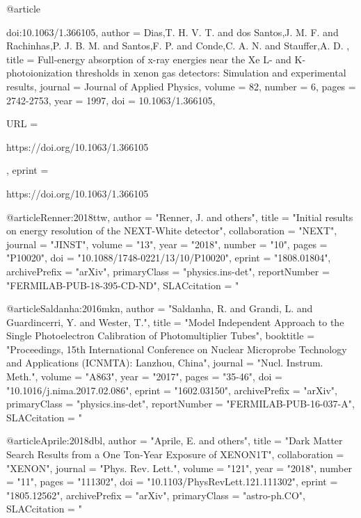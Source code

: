 {{{{{{{{{{{@article{doi:10.1063/1.366105,
author = {Dias,T. H. V. T.  and dos Santos,J. M. F.  and Rachinhas,P. J. B. M.  and Santos,F. P.  and Conde,C. A. N.  and Stauffer,A. D. },
title = {Full-energy absorption of x-ray energies near the Xe L- and K-photoionization thresholds in xenon gas detectors: Simulation and experimental results},
journal = {Journal of Applied Physics},
volume = {82},
number = {6},
pages = {2742-2753},
year = {1997},
doi = {10.1063/1.366105},

URL = { 
        https://doi.org/10.1063/1.366105
    
},
eprint = { 
        https://doi.org/10.1063/1.366105
    
}

}

@article{Renner:2018ttw,
      author         = "Renner, J. and others",
      title          = "{Initial results on energy resolution of the NEXT-White
                        detector}",
      collaboration  = "NEXT",
      journal        = "JINST",
      volume         = "13",
      year           = "2018",
      number         = "10",
      pages          = "P10020",
      doi            = "10.1088/1748-0221/13/10/P10020",
      eprint         = "1808.01804",
      archivePrefix  = "arXiv",
      primaryClass   = "physics.ins-det",
      reportNumber   = "FERMILAB-PUB-18-395-CD-ND",
      SLACcitation   = "%
}

@article{Saldanha:2016mkn,
      author         = "Saldanha, R. and Grandi, L. and Guardincerri, Y. and
                        Wester, T.",
      title          = "{Model Independent Approach to the Single Photoelectron
                        Calibration of Photomultiplier Tubes}",
      booktitle      = "{Proceedings, 15th International Conference on Nuclear
                        Microprobe Technology and Applications (ICNMTA): Lanzhou,
                        China}",
      journal        = "Nucl. Instrum. Meth.",
      volume         = "A863",
      year           = "2017",
      pages          = "35-46",
      doi            = "10.1016/j.nima.2017.02.086",
      eprint         = "1602.03150",
      archivePrefix  = "arXiv",
      primaryClass   = "physics.ins-det",
      reportNumber   = "FERMILAB-PUB-16-037-A",
      SLACcitation   = "%
}


@article{Aprile:2018dbl,
      author         = "Aprile, E. and others",
      title          = "{Dark Matter Search Results from a One Ton-Year Exposure
                        of XENON1T}",
      collaboration  = "XENON",
      journal        = "Phys. Rev. Lett.",
      volume         = "121",
      year           = "2018",
      number         = "11",
      pages          = "111302",
      doi            = "10.1103/PhysRevLett.121.111302",
      eprint         = "1805.12562",
      archivePrefix  = "arXiv",
      primaryClass   = "astro-ph.CO",
      SLACcitation   = "%
}

}}}}}}}}}}}
